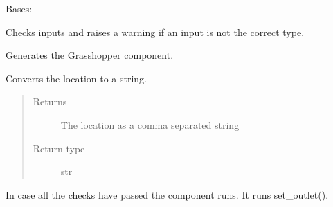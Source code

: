 \documentclass[letterpaper,10pt,english]{sphinxmanual}
\begin{document}
\begin{fulllineitems}
\label{\detokenize{cmf:livestock.components.comp_cmf.CMFOutlet}}
Bases: {\hyperref[\detokenize{superclass:livestock.components.component.GHComponent}]{}}

\begin{fulllineitems}
\label{\detokenize{cmf:livestock.components.comp_cmf.CMFOutlet.check_inputs}}
Checks inputs and raises a warning if an input is not the correct type.

\end{fulllineitems}


\begin{fulllineitems}
\label{\detokenize{cmf:livestock.components.comp_cmf.CMFOutlet.config}}
Generates the Grasshopper component.

\end{fulllineitems}


\begin{fulllineitems}
\label{\detokenize{cmf:livestock.components.comp_cmf.CMFOutlet.location_to_string}}
Converts the location to a string.
\begin{quote}\begin{description}
\item[{Returns}] \leavevmode
The location as a comma separated string

\item[{Return type}] \leavevmode
str

\end{description}\end{quote}

\end{fulllineitems}


\begin{fulllineitems}
\label{\detokenize{cmf:livestock.components.comp_cmf.CMFOutlet.run}}
In case all the checks have passed the component runs.
It runs set\_outlet().


\end{fulllineitems}
\end{fulllineitems}
\end{document}
